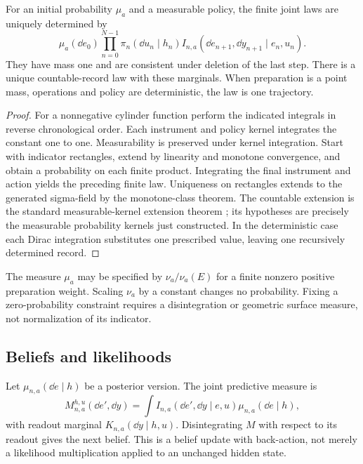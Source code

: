 \begin{theorem}\label{thm:instrument-path}
For an initial probability $\mu_a$ and a measurable policy, the finite joint laws are uniquely determined by
\begin{equation}
 \mu_a(\dd e_0)\prod_{n=0}^{N-1}
 \pi_n(\dd u_n\mid h_n)
 I_{n,a}(\dd e_{n+1},\dd y_{n+1}\mid e_n,u_n).
 \label{eq:instrument-path}
\end{equation}
They have mass one and are consistent under deletion of the last step. There is a unique countable-record law with these marginals. When preparation is a point mass, operations and policy are deterministic, the law is one trajectory.
\end{theorem}
\begin{proof}
For a nonnegative cylinder function perform the indicated integrals in reverse chronological order. Each instrument and policy kernel integrates the constant one to one. Measurability is preserved under kernel integration. Start with indicator rectangles, extend by linearity and monotone convergence, and obtain a probability on each finite product. Integrating the final instrument and action yields the preceding finite law. Uniqueness on rectangles extends to the generated sigma-field by the monotone-class theorem. The countable extension is the standard measurable-kernel extension theorem \cite{Kallenberg}; its hypotheses are precisely the measurable probability kernels just constructed. In the deterministic case each Dirac integration substitutes one prescribed value, leaving one recursively determined record.
\end{proof}

The measure $\mu_a$ may be specified by $\nu_a/\nu_a(E)$ for a finite nonzero positive preparation weight. Scaling $\nu_a$ by a constant changes no probability. Fixing a zero-probability constraint requires a disintegration or geometric surface measure, not normalization of its indicator.

\subsection{Beliefs and likelihoods}
Let $\mu_{n,a}(\dd e\mid h)$ be a posterior version. The joint predictive measure is
\[
 M_{n,a}^{h,u}(\dd e',\dd y)
 =\int I_{n,a}(\dd e',\dd y\mid e,u)\mu_{n,a}(\dd e\mid h),
\]
with readout marginal $K_{n,a}(\dd y\mid h,u)$. Disintegrating $M$ with respect to its readout gives the next belief. This is a belief update with back-action, not merely a likelihood multiplication applied to an unchanged hidden state.

